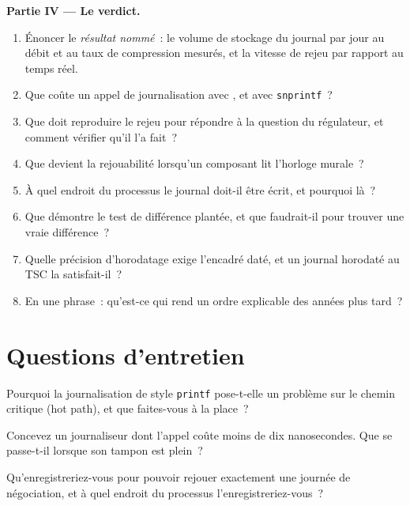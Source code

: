 \begin{problem}
\medskip\noindent\textbf{Partie IV --- Le verdict.}
\begin{enumerate}[resume]
\item Énoncer le \emph{résultat nommé}~: le volume de stockage du journal par jour au débit et au taux de compression mesurés, et la vitesse de rejeu
par rapport au temps réel.
\item Que coûte un appel de journalisation avec , et avec \texttt{snprintf}~?
\item Que doit reproduire le rejeu pour répondre à la question du régulateur, et comment vérifier qu'il l'a fait~?
\item Que devient la rejouabilité lorsqu'un composant lit l'horloge murale~?
\item À quel endroit du processus le journal doit-il être écrit, et pourquoi là~?
\item Que démontre le test de différence plantée, et que faudrait-il pour trouver une vraie différence~?
\item Quelle précision d'horodatage exige l'encadré daté, et un journal horodaté au TSC la satisfait-il~?
\item En une phrase~: qu'est-ce qui rend un ordre explicable des années plus tard~?
\end{enumerate}
\end{problem}

\section{Questions d'entretien}

\begin{interviewq}\label{iq:ll:logging-capture-and-replay:1}
Pourquoi la journalisation de style \texttt{printf} pose-t-elle un problème sur le chemin critique (hot path), et que faites-vous à la place~?
\end{interviewq}

\begin{interviewq}\label{iq:ll:logging-capture-and-replay:2}
Concevez un journaliseur dont l'appel coûte moins de dix nanosecondes. Que se passe-t-il lorsque son tampon est plein~?
\end{interviewq}

\begin{interviewq}\label{iq:ll:logging-capture-and-replay:3}
Qu'enregistreriez-vous pour pouvoir rejouer exactement une journée de négociation, et à quel endroit du processus l'enregistreriez-vous~?
\end{interviewq}

